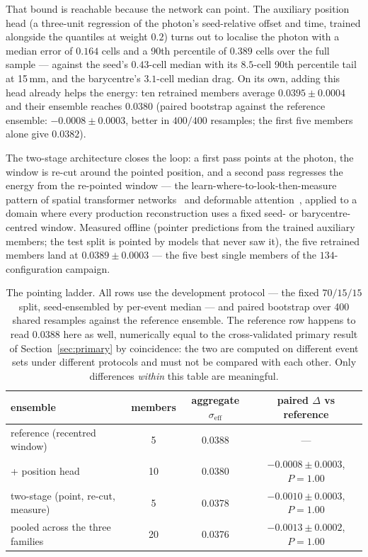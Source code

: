 \documentclass[11pt,a4paper]{article}
\newcommand{\seff}{\ensuremath{\sigma_{\mathrm{eff}}}}
\begin{document}
That bound is reachable because the network can point. The auxiliary
position head (a three-unit regression of the photon's seed-relative
offset and time, trained alongside the quantiles at weight $0.2$) turns
out to localise the photon with a median error of $0.164$ cells and a
90th percentile of $0.389$ cells over the full sample --- against the
seed's $0.43$-cell median with its $8.5$-cell 90th percentile tail at
15\,mm, and the barycentre's $3.1$-cell median drag. On its own, adding
this head already helps the energy: ten retrained members average
$0.0395 \pm 0.0004$ and their ensemble reaches $0.0380$ (paired
bootstrap against the reference ensemble: $-0.0008 \pm 0.0003$, better in
$400/400$ resamples; the first five members alone give $0.0382$).

The two-stage architecture closes the loop: a first pass points at the
photon, the window is re-cut around the pointed position, and a second
pass regresses the energy from the re-pointed window --- the
learn-where-to-look-then-measure pattern of spatial transformer
networks~\cite{stn} and deformable attention~\cite{deformabledetr},
applied to a domain where every production reconstruction uses a fixed
seed- or barycentre-centred window. Measured offline (pointer
predictions from the trained auxiliary members; the test split is
pointed by models that never saw it), the five retrained members land at
$0.0389 \pm 0.0003$ --- the five best single members of the
$134$-configuration campaign.

\begin{table}[h]
\centering
\caption{The pointing ladder. All rows use the development protocol --- the
fixed $70/15/15$ split, seed-ensembled by per-event median --- and paired
bootstrap over 400 shared resamples against the reference ensemble. The
reference row happens to read $0.0388$ here as well, numerically equal to the
cross-validated primary result of Section~\ref{sec:primary} by coincidence:
the two are computed on different event sets under different protocols and
must not be compared with each other. Only differences \emph{within} this
table are meaningful.}
\label{tab:pointing}
\begin{tabular}{lccc}
\toprule
ensemble & members & aggregate \seff{} & paired $\Delta$ vs reference\\
\midrule
reference (recentred window) & 5 & 0.0388 & ---\\
+ position head & 10 & 0.0380 & $-0.0008 \pm 0.0003$, $P{=}1.00$\\
two-stage (point, re-cut, measure) & 5 & 0.0378 & $-0.0010 \pm 0.0003$, $P{=}1.00$\\
pooled across the three families & 20 & 0.0376 & $-0.0013 \pm 0.0002$, $P{=}1.00$\\
\bottomrule
\end{tabular}
\end{table}
\end{document}
